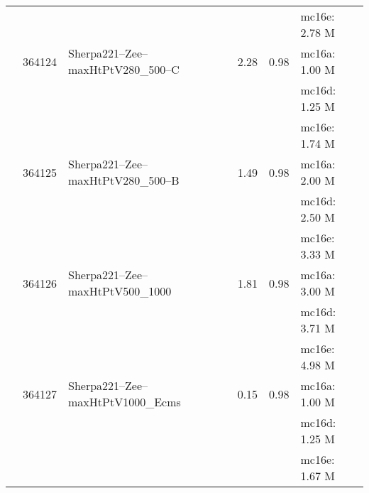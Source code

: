 \begin{center}
{\begin{xtabular}{lclS[round-mode=figures, round-precision=3]S[round-mode=places,  round-precision=2]l}
			& & & & & mc16e: 2.78 M \\
			& 364124 & Sherpa221--Zee--maxHtPtV280\_500--C & 2.28 & 0.98 &  mc16a: 1.00 M \\
			& & & & & mc16d: 1.25 M \\
			& & & & & mc16e: 1.74 M \\
			& 364125 & Sherpa221--Zee--maxHtPtV280\_500--B & 1.49 & 0.98 &  mc16a: 2.00 M \\
			& & & & & mc16d: 2.50 M \\
			& & & & & mc16e: 3.33 M \\
			& 364126 & Sherpa221--Zee--maxHtPtV500\_1000       & 1.81 & 0.98 &  mc16a: 3.00 M \\
			& & & & & mc16d: 3.71 M \\
			& & & & & mc16e: 4.98 M \\
			& 364127 & Sherpa221--Zee--maxHtPtV1000\_Ecms     & 0.15 & 0.98 &  mc16a: 1.00 M \\
			& & & & & mc16d: 1.25 M \\
			& & & & & mc16e: 1.67 M \\
			

\end{xtabular}}
\end{center}
